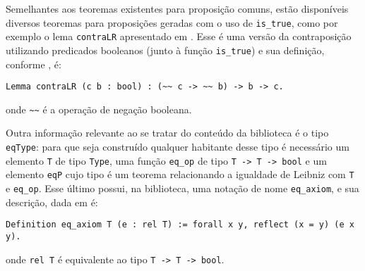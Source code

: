 Semelhantes aos teoremas existentes para proposição comuns, estão disponíveis diversos teoremas para proposições geradas com o uso de \lstinline[language = coq]$is_true$, como por exemplo o lema \lstinline[language = coq]$contraLR$ apresentado em \cite{assia_mahboubi_2022_7118596}. Esse é uma versão da contraposição utilizando predicados booleanos (junto à função \lstinline[language = coq]$is_true$) e sua definição, conforme \cite{assia_mahboubi_2022_7118596}, é: 
    \begin{lstlisting}[language=coq,frame=single,tabsize=1]
Lemma contraLR (c b : bool) : (~~ c -> ~~ b) -> b -> c.
    \end{lstlisting}
onde \lstinline[language = coq]$~~$ é a operação de negação booleana.

Outra informação relevante ao se tratar do conteúdo da biblioteca é o tipo \lstinline[language = coq]$eqType$: para que seja construído qualquer habitante desse tipo é necessário um elemento \lstinline[language = coq]$T$ de tipo 
\lstinline[language = coq]$Type$, uma função \lstinline[language = coq]$eq_op$ de tipo \lstinline[language = coq]$T -> T -> bool$
e um elemento \lstinline[language = coq]$eqP$ cujo tipo é um teorema relacionando a igualdade de Leibniz com \lstinline[language = coq]$T$ e \lstinline[language = coq]$eq_op$. Esse último possui, na biblioteca, uma notação de nome \lstinline[language = coq]$eq_axiom$, e sua descrição, dada em \cite{mathcomp-eqtype} é:
    \begin{lstlisting}[language=coq,frame=single,tabsize=1]
Definition eq_axiom T (e : rel T) := forall x y, reflect (x = y) (e x y).
    \end{lstlisting}
onde \lstinline[language = coq]$rel T$ é equivalente ao tipo \lstinline[language = coq]$T -> T -> bool$.

